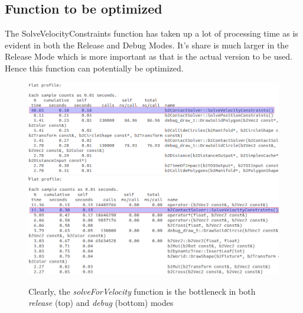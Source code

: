 \documentclass[11pt]{article}
\begin{document}
\subsection{Function to be optimized}
The SolveVelocityConstraints function has taken up a lot of processing time as is evident in both the Release and Debug Modes. It's share is much larger in the Release Mode which is more important as that is the actual version to be used. Hence this function can potentially be optimized.
\begin{figure}[h]
\centering
\includegraphics[scale=0.4]{Selection_002.png}
\includegraphics[scale=0.4]{Selection_003.png}
\caption{Clearly, the \textit{solveForVelocity} function is the bottleneck in both \textit{release} (top) and \textit{debug} (bottom) modes}
\end{figure}


\end{document}
